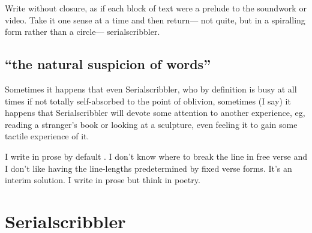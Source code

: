 \documentclass[
]{memoir}
\begin{document}
Write without closure, as if each block of text were a prelude to the
soundwork or video. Take it one sense at a time and then return--- not
quite, but in a spiralling form rather than a circle--- serialscribbler.

\hypertarget{the-natural-suspicion-of-words}{%
\subsection*{``the natural suspicion of
words''}\label{the-natural-suspicion-of-words}}

Sometimes it happens that even Serialscribbler, who by definition is
busy at all times if not totally self-absorbed to the point of oblivion,
sometimes (I say) it happens that Serialscribbler will devote some
attention to another experience, eg, reading a stranger's book or
looking at a sculpture, even feeling it to gain some tactile experience
of it.

I write in prose by default . I don't know where to break the line in
free verse and I don't like having the line-lengths predetermined by
fixed verse forms. It's an interim solution. I write in prose but think
in poetry.

\hypertarget{serialscribbler}{%
\section*{Serialscribbler}\label{serialscribbler}}
\end{document}
